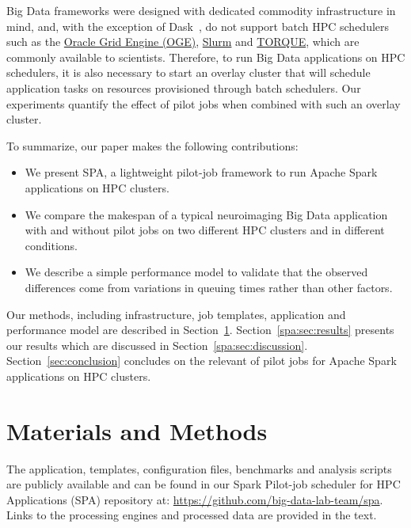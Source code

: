     
    Big Data frameworks were designed with dedicated commodity infrastructure
    in mind, and, with the exception of Dask~\cite{rocklin2015dask}, do not support batch
    HPC schedulers such as the \href{http://www.univa.com/products/}{Oracle Grid Engine (OGE)},
    \href{https://slurm.schedmd.com/}{Slurm} and \href{https://www.adaptivecomputing.com/products/torque/}{TORQUE}, which
    are commonly available to scientists. Therefore, to run Big Data
    applications on HPC schedulers, it is also necessary to start an overlay
    cluster that will schedule application tasks on resources provisioned
    through batch schedulers. Our experiments quantify the effect of pilot jobs
    when combined with such an overlay cluster.
    
    To summarize, our paper
    makes the following contributions:
    \begin{itemize}
    \item We present SPA, a lightweight pilot-job framework to run Apache Spark
    applications on HPC clusters.
    \item We compare the makespan of a typical neuroimaging Big Data
    application with and without pilot jobs on two different HPC clusters and
    in different conditions.
    \item We describe a simple performance model to validate that the observed
    differences come from variations in queuing times rather than other
    factors.
    \end{itemize}
    Our methods, including infrastructure, job templates, application and
    performance model are described in Section~\ref{spa:sec:methods}.
    Section~\ref{spa:sec:results} presents our results which are discussed in
    Section~\ref{spa:sec:discussion}. Section~\ref{sec:conclusion} concludes on the 
    relevant of pilot jobs for Apache Spark applications on HPC clusters.
    
    \section{Materials and Methods}\label{spa:sec:methods}
    
	The application, templates, configuration files, benchmarks and
	analysis scripts are publicly available and can be found in our Spark
	Pilot-job scheduler for HPC Applications (SPA) repository at:
	\href{https://github.com/big-data-lab-team/spa}{https://github.com/big-data-lab-team/spa}.
	Links to the processing engines and processed data are provided in the
	text.
	
